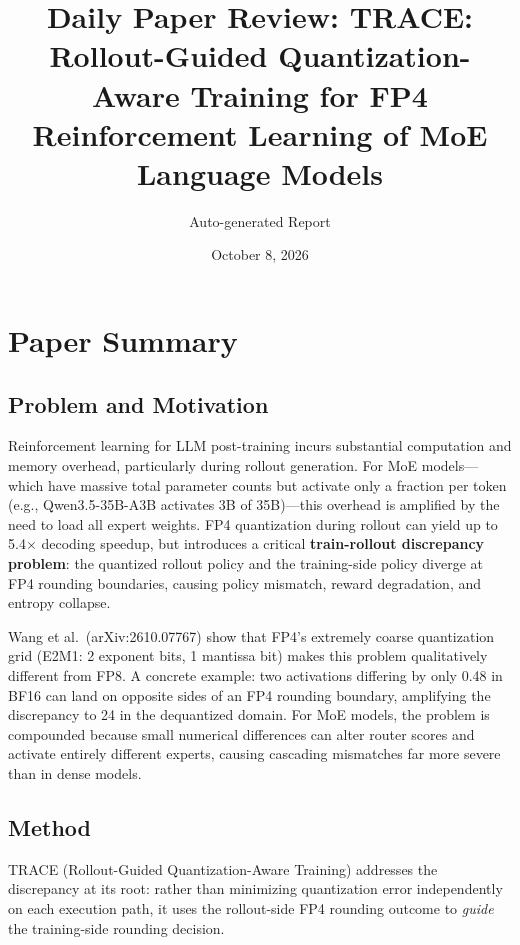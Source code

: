 \documentclass[11pt,a4paper]{article}
\title{Daily Paper Review: TRACE: Rollout-Guided Quantization-Aware Training for FP4 Reinforcement Learning of MoE Language Models}
\author{Auto-generated Report}
\date{October 8, 2026}
\begin{document}
\maketitle

\section{Paper Summary}

\subsection{Problem and Motivation}
Reinforcement learning for LLM post-training incurs substantial computation and memory overhead, particularly during rollout generation. For MoE models---which have massive total parameter counts but activate only a fraction per token (e.g., Qwen3.5-35B-A3B activates 3B of 35B)---this overhead is amplified by the need to load all expert weights. FP4 quantization during rollout can yield up to 5.4$\times$ decoding speedup, but introduces a critical \textbf{train-rollout discrepancy problem}: the quantized rollout policy and the training-side policy diverge at FP4 rounding boundaries, causing policy mismatch, reward degradation, and entropy collapse.

Wang et al.\ (arXiv:2610.07767) show that FP4's extremely coarse quantization grid (E2M1: 2 exponent bits, 1 mantissa bit) makes this problem qualitatively different from FP8. A concrete example: two activations differing by only 0.48 in BF16 can land on opposite sides of an FP4 rounding boundary, amplifying the discrepancy to 24 in the dequantized domain. For MoE models, the problem is compounded because small numerical differences can alter router scores and activate entirely different experts, causing cascading mismatches far more severe than in dense models.

\subsection{Method}
TRACE (Rollout-Guided Quantization-Aware Training) addresses the discrepancy at its root: rather than minimizing quantization error independently on each execution path, it uses the rollout-side FP4 rounding outcome to \emph{guide} the training-side rounding decision.
\end{document}
